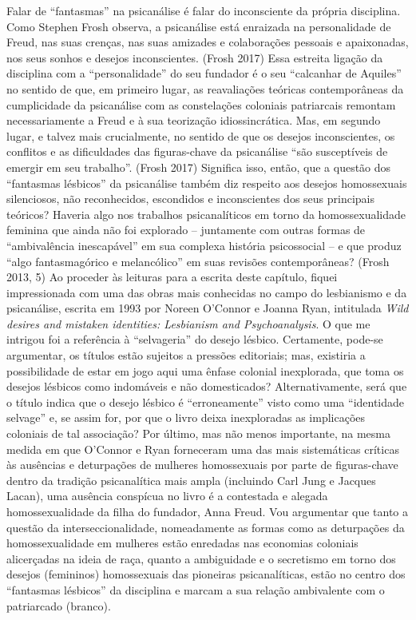 Falar de ``fantasmas'' na psicanálise é falar do inconsciente da própria
disciplina. Como Stephen Frosh observa, a psicanálise está enraizada na
personalidade de Freud, nas suas crenças, nas suas amizades e
colaborações pessoais e apaixonadas, nos seus sonhos e desejos
inconscientes. (Frosh 2017) Essa estreita ligação da disciplina com a
``personalidade'' do seu fundador é o seu ``calcanhar de Aquiles'' no
sentido de que, em primeiro lugar, as reavaliações teóricas
contemporâneas da cumplicidade da psicanálise com as constelações
coloniais patriarcais remontam necessariamente a Freud e à sua
teorização idiossincrática. Mas, em segundo lugar, e talvez mais
crucialmente, no sentido de que os desejos inconscientes, os conflitos e
as dificuldades das figuras-chave da psicanálise ``são susceptíveis de
emergir em seu trabalho''. (Frosh 2017) Significa isso, então, que a
questão dos ``fantasmas lésbicos'' da psicanálise também diz respeito aos
desejos homossexuais silenciosos, não reconhecidos, escondidos e
inconscientes dos seus principais teóricos? Haveria algo nos trabalhos
psicanalíticos em torno da homossexualidade feminina que ainda não foi
explorado -- juntamente com outras formas de ``ambivalência inescapável''
em sua complexa história psicossocial -- e que produz ``algo
fantasmagórico e melancólico'' em suas revisões contemporâneas? (Frosh
2013, 5) Ao proceder às leituras para a escrita deste capítulo, fiquei
impressionada com uma das obras mais conhecidas no campo do lesbianismo
e da psicanálise, escrita em 1993 por Noreen O'Connor e Joanna Ryan,
intitulada \emph{Wild desires and mistaken identities: Lesbianism and
Psychoanalysis}. O que me intrigou foi a referência à ``selvageria'' do
desejo lésbico. Certamente, pode-se argumentar, os títulos estão
sujeitos a pressões editoriais; mas, existiria a possibilidade de estar
em jogo aqui uma ênfase colonial inexplorada, que toma os desejos
lésbicos como indomáveis e não domesticados? Alternativamente, será que
o título indica que o desejo lésbico é ``erroneamente'' visto como uma
``identidade selvage'' e, se assim for, por que o livro deixa
inexploradas as implicações coloniais de tal associação? Por último, mas
não menos importante, na mesma medida em que O'Connor e Ryan forneceram
uma das mais sistemáticas críticas às ausências e deturpações de
mulheres homossexuais por parte de figuras-chave dentro da tradição
psicanalítica mais ampla (incluindo Carl Jung e Jacques Lacan), uma
ausência conspícua no livro é a contestada e alegada homossexualidade da
filha do fundador, Anna Freud. Vou argumentar que tanto a questão da
interseccionalidade, nomeadamente as formas como as deturpações da
homossexualidade em mulheres estão enredadas nas economias coloniais
alicerçadas na ideia de raça, quanto a ambiguidade e o secretismo em
torno dos desejos (femininos) homossexuais das pioneiras psicanalíticas,
estão no centro dos ``fantasmas lésbicos'' da disciplina e marcam a sua
relação ambivalente com o patriarcado (branco).

